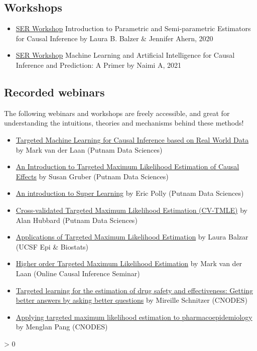 \documentclass[
]{book}
\providecommand{\tightlist}{%
  \setlength{\itemsep}{0pt}\setlength{\parskip}{0pt}}
\newlength{\cslhangindent}
\newenvironment{CSLReferences}[2] %
 {%
  \setlength{\parindent}{0pt}
  \ifodd #1 \everypar{\setlength{\hangindent}{\cslhangindent}}\ignorespaces\fi
  \ifnum #2 > 0
  \setlength{\parskip}{#2\baselineskip}
  \fi
 }%
 {}
\begin{document}
\hypertarget{workshops}{%
\subsection{Workshops}\label{workshops}}

\begin{itemize}
\tightlist
\item
  \href{https://epiresearch.org/}{SER Workshop} Introduction to Parametric and Semi-parametric Estimators for Causal Inference by Laura B. Balzer \& Jennifer Ahern, 2020
\item
  \href{https://epiresearch.org/}{SER Workshop} Machine Learning and Artificial Intelligence for Causal Inference and Prediction: A Primer by Naimi A, 2021
\end{itemize}

\hypertarget{recorded-webinars}{%
\subsection{Recorded webinars}\label{recorded-webinars}}

The following webinars and workshops are freely accessible, and great for understanding the intuitions, theories and mechanisms behind these methods!

\begin{itemize}
\tightlist
\item
  \href{https://www.youtube.com/watch?v=PrPNP5RVcLg}{Targeted Machine Learning for Causal Inference based on Real World Data} by Mark van der Laan (Putnam Data Sciences)
\item
  \href{https://www.youtube.com/watch?v=8Q9dfW3oOi4}{An Introduction to Targeted Maximum Likelihood Estimation of Causal Effects} by Susan Gruber (Putnam Data Sciences)
\item
  \href{https://www.youtube.com/watch?v=1zT17HtvtF8}{An introduction to Super Learning} by Eric Polly (Putnam Data Sciences)
\item
  \href{https://www.youtube.com/watch?v=MDmddX267Ys}{Cross-validated Targeted Maximum Likelihood Estimation (CV-TMLE)} by Alan Hubbard (Putnam Data Sciences)
\item
  \href{https://www.youtube.com/watch?v=foY7HoCeo88}{Applications of Targeted Maximum Likelihood Estimation} by Laura Balzar (UCSF Epi \& Biostats)
\item
  \href{https://www.youtube.com/watch?v=2jumfnRQpxs}{Higher order Targeted Maximum Likelihood Estimation} by Mark van der Laan (Online Causal Inference Seminar)
\item
  \href{http://bcooltv.mcgill.ca/FDownloader.aspx?rid=e3143be2-918d-49d9-82ce-4dfea75ef1dc\&DLType=VGAMP4}{Targeted learning for the estimation of drug safety and effectiveness: Getting better answers by asking better questions} by Mireille Schnitzer (CNODES)
\item
  \href{https://www.cnodes.ca/online-lecture/targeted-learning-estimation/}{Applying targeted maximum likelihood estimation to pharmacoepidemiology} by Menglan Pang (CNODES)
\end{itemize}

\hypertarget{refs}{}
\begin{CSLReferences}{0}{0}
\end{CSLReferences}

  
\end{document}
